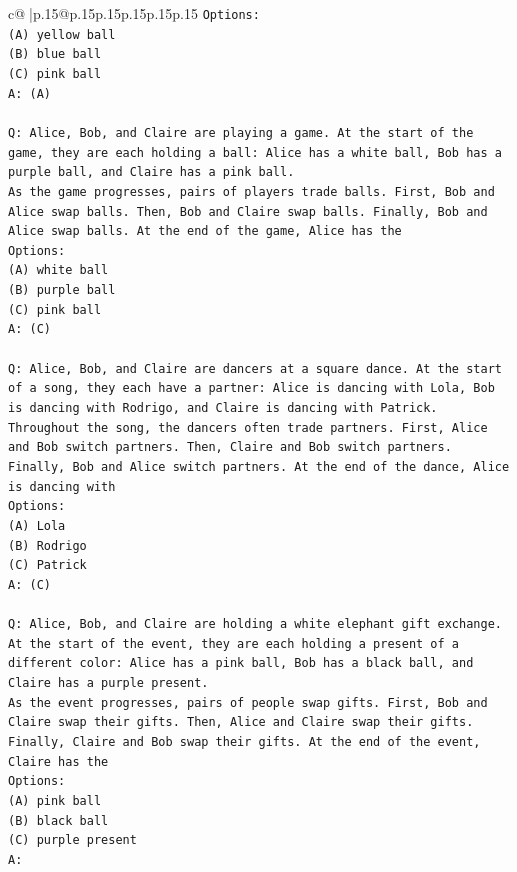 \documentclass{article}
\begin{document}
{\begin{supertabular}{c@{$\;$}|p{.15\linewidth}@{}p{.15\linewidth}p{.15\linewidth}p{.15\linewidth}p{.15\linewidth}p{.15\linewidth}}
{{{\texttt{Options:} \\
\texttt{(A) yellow ball} \\
\texttt{(B) blue ball} \\
\texttt{(C) pink ball} \\
\texttt{A: (A)} \\
\\ 
\texttt{Q: Alice, Bob, and Claire are playing a game. At the start of the game, they are each holding a ball: Alice has a white ball, Bob has a purple ball, and Claire has a pink ball.} \\
\texttt{As the game progresses, pairs of players trade balls. First, Bob and Alice swap balls. Then, Bob and Claire swap balls. Finally, Bob and Alice swap balls. At the end of the game, Alice has the} \\
\texttt{Options:} \\
\texttt{(A) white ball} \\
\texttt{(B) purple ball} \\
\texttt{(C) pink ball} \\
\texttt{A: (C)} \\
\\ 
\texttt{Q: Alice, Bob, and Claire are dancers at a square dance. At the start of a song, they each have a partner: Alice is dancing with Lola, Bob is dancing with Rodrigo, and Claire is dancing with Patrick.} \\
\texttt{Throughout the song, the dancers often trade partners. First, Alice and Bob switch partners. Then, Claire and Bob switch partners. Finally, Bob and Alice switch partners. At the end of the dance, Alice is dancing with} \\
\texttt{Options:} \\
\texttt{(A) Lola} \\
\texttt{(B) Rodrigo} \\
\texttt{(C) Patrick} \\
\texttt{A: (C)} \\
\\ 
\texttt{Q: Alice, Bob, and Claire are holding a white elephant gift exchange. At the start of the event, they are each holding a present of a different color: Alice has a pink ball, Bob has a black ball, and Claire has a purple present.} \\
\texttt{As the event progresses, pairs of people swap gifts. First, Bob and Claire swap their gifts. Then, Alice and Claire swap their gifts. Finally, Claire and Bob swap their gifts. At the end of the event, Claire has the} \\
\texttt{Options:} \\
\texttt{(A) pink ball} \\
\texttt{(B) black ball} \\
\texttt{(C) purple present} \\
\texttt{A:} \\
            }
        }
    }
     \\ \\


\end{supertabular}}
\end{document}
